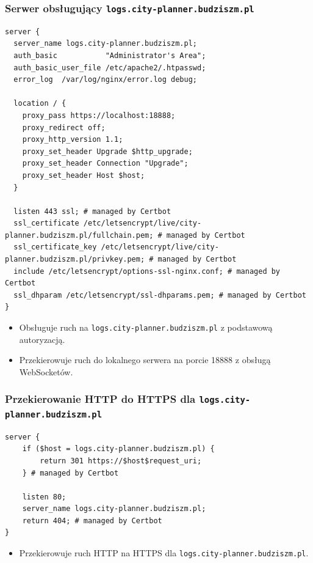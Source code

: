 \subsubsection{Serwer obsługujący \texttt{logs.city-planner.budziszm.pl}}
\begin{lstlisting}[label={lst:n9}]
server {
  server_name logs.city-planner.budziszm.pl;
  auth_basic           "Administrator's Area";
  auth_basic_user_file /etc/apache2/.htpasswd;
  error_log  /var/log/nginx/error.log debug;

  location / {
    proxy_pass https://localhost:18888;
    proxy_redirect off;
    proxy_http_version 1.1;
    proxy_set_header Upgrade $http_upgrade;
    proxy_set_header Connection "Upgrade";
    proxy_set_header Host $host;
  }

  listen 443 ssl; # managed by Certbot
  ssl_certificate /etc/letsencrypt/live/city-planner.budziszm.pl/fullchain.pem; # managed by Certbot
  ssl_certificate_key /etc/letsencrypt/live/city-planner.budziszm.pl/privkey.pem; # managed by Certbot
  include /etc/letsencrypt/options-ssl-nginx.conf; # managed by Certbot
  ssl_dhparam /etc/letsencrypt/ssl-dhparams.pem; # managed by Certbot
}
\end{lstlisting}
\begin{itemize}
    \item Obsługuje ruch na \texttt{logs.city-planner.budziszm.pl} z podstawową autoryzacją.
    \item Przekierowuje ruch do lokalnego serwera na porcie 18888 z obsługą WebSocketów.
\end{itemize}

\subsubsection{Przekierowanie HTTP do HTTPS dla \texttt{logs.city-planner.budziszm.pl}}
\begin{lstlisting}[label={lst:n10}]
server {
    if ($host = logs.city-planner.budziszm.pl) {
        return 301 https://$host$request_uri;
    } # managed by Certbot

    listen 80;
    server_name logs.city-planner.budziszm.pl;
    return 404; # managed by Certbot
}
\end{lstlisting}
\begin{itemize}
    \item Przekierowuje ruch HTTP na HTTPS dla \texttt{logs.city-planner.budziszm.pl}.
\end{itemize}

